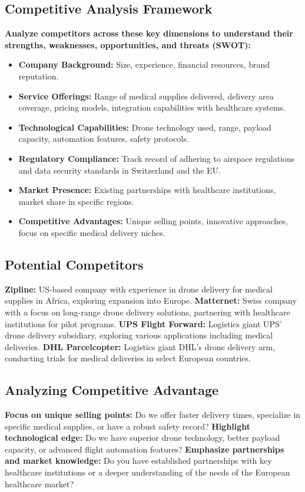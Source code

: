 \subsection{Competitive Analysis Framework}
\textbf{Analyze competitors across these key dimensions to understand their strengths, weaknesses, opportunities, and threats (SWOT):}
\begin{itemize}
  \item \textbf{Company Background:} Size, experience, financial resources, brand reputation.
  \item \textbf{Service Offerings:} Range of medical supplies delivered, delivery area coverage, pricing models, integration capabilities with healthcare systems.
  \item \textbf{Technological Capabilities:} Drone technology used, range, payload capacity, automation features, safety protocols.
  \item \textbf{Regulatory Compliance:} Track record of adhering to airspace regulations and data security standards in Switzerland and the EU.
  \item \textbf{Market Presence:} Existing partnerships with healthcare institutions, market share in specific regions.
  \item \textbf{Competitive Advantages:} Unique selling points, innovative approaches, focus on specific medical delivery niches.
\end{itemize}
\subsection{Potential Competitors}
\textbf{Zipline:} US-based company with experience in drone delivery for medical supplies in Africa, exploring expansion into Europe. \cite{zipline_24}
\newline
\textbf{Matternet:} Swiss company with a focus on long-range drone delivery solutions, partnering with healthcare institutions for pilot programs. \cite{pasternack_2022_matternet}
\newline
\textbf{UPS Flight Forward:} Logistics giant UPS' drone delivery subsidiary, exploring various applications including medical deliveries. \cite{unitedparcelserviceofamericainc_2021_drone}
\newline
\textbf{DHL Parcelcopter:} Logistics giant DHL's drone delivery arm, conducting trials for medical deliveries in select European countries. \cite{dhl}
\subsection{Analyzing Competitive Advantage}
\textbf{Focus on unique selling points:} Do we offer faster delivery times, specialize in specific medical supplies, or have a robust safety record?
\newline
\textbf{Highlight technological edge:} Do we have superior drone technology, better payload capacity, or advanced flight automation features?
\newline
\textbf{Emphasize partnerships and market knowledge:} Do you have established partnerships with key healthcare institutions or a deeper understanding of the needs of the European healthcare market?
